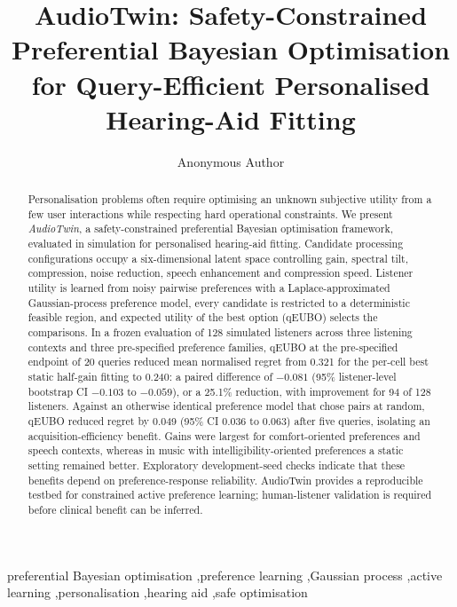 \documentclass[preprint,12pt]{elsarticle}
\begin{document}
\begin{frontmatter}

\title{AudioTwin: Safety-Constrained Preferential Bayesian Optimisation for Query-Efficient Personalised Hearing-Aid Fitting}

\author[anon]{Anonymous Author}
\address[anon]{Anonymous Institution}

\begin{abstract}
Personalisation problems often require optimising an unknown subjective utility from a few user interactions while respecting hard operational constraints. We present \textit{AudioTwin}, a safety-constrained preferential Bayesian optimisation framework, evaluated in simulation for personalised hearing-aid fitting. Candidate processing configurations occupy a six-dimensional latent space controlling gain, spectral tilt, compression, noise reduction, speech enhancement and compression speed. Listener utility is learned from noisy pairwise preferences with a Laplace-approximated Gaussian-process preference model, every candidate is restricted to a deterministic feasible region, and expected utility of the best option (qEUBO) selects the comparisons. In a frozen evaluation of 128 simulated listeners across three listening contexts and three pre-specified preference families, qEUBO at the pre-specified endpoint of 20 queries reduced mean normalised regret from 0.321 for the per-cell best static half-gain fitting to 0.240: a paired difference of $-0.081$ (95\% listener-level bootstrap CI $-0.103$ to $-0.059$), or a 25.1\% reduction, with improvement for 94 of 128 listeners. Against an otherwise identical preference model that chose pairs at random, qEUBO reduced regret by 0.049 (95\% CI 0.036 to 0.063) after five queries, isolating an acquisition-efficiency benefit. Gains were largest for comfort-oriented preferences and speech contexts, whereas in music with intelligibility-oriented preferences a static setting remained better. Exploratory development-seed checks indicate that these benefits depend on preference-response reliability. AudioTwin provides a reproducible testbed for constrained active preference learning; human-listener validation is required before clinical benefit can be inferred.
\end{abstract}

\begin{keyword}
preferential Bayesian optimisation \sep preference learning \sep Gaussian process \sep active learning \sep personalisation \sep hearing aid \sep safe optimisation
\end{keyword}

\end{frontmatter}
\end{document}
